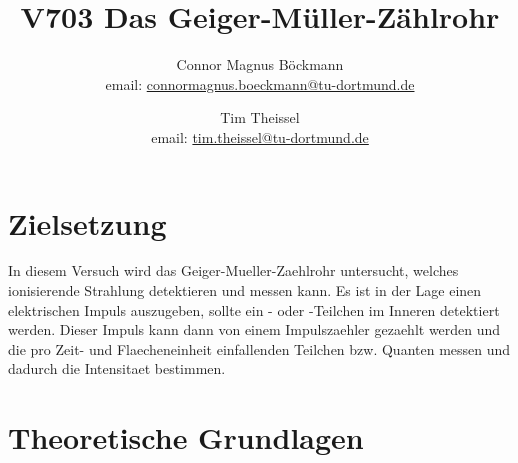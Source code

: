 \documentclass[titlepage=firstcover, captions=tableheading]{scrartcl}
\title{V703 Das Geiger-Müller-Zählrohr}
\author{
Connor Magnus Böckmann \\ email: \href{mailto:connormagnus.boeckmann@tu-dortmund.de}{connormagnus.boeckmann@tu-dortmund.de}
\and Tim Theissel \\ email: \href{mailto:tim.theissel@tu-dortmund.de}{tim.theissel@tu-dortmund.de}}
\begin{document}
\maketitle
\newpage
\tableofcontents
\newpage
\section{Zielsetzung}
In diesem Versuch wird das Geiger-Mueller-Zaehlrohr untersucht, welches ionisierende Strahlung detektieren und messen kann. Es ist in der Lage einen elektrischen Impuls auszugeben, sollte ein \alpha- oder \beta-Teilchen im Inneren detektiert werden. Dieser Impuls kann dann von einem Impulszaehler gezaehlt werden und die pro Zeit- und Flaecheneinheit einfallenden Teilchen bzw. Quanten messen und dadurch die Intensitaet bestimmen. 
\section{Theoretische Grundlagen}
\end{document}

